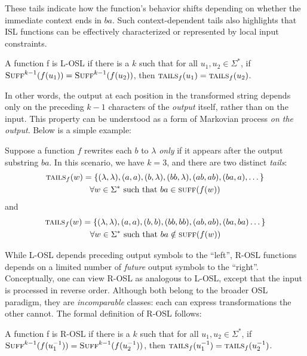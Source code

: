 These tails indicate how the function's behavior shifts depending on whether the immediate context ends in $ba$. Such context-dependent tails also highlights that ISL functions can be effectively characterized or represented by local input constraints.

\begin{definition}[L-OSL]
A function f is L-OSL if there is a $k$ such that for all $u_1, u_2\in\Sigma^*$, if $\textsc{Suff}^{k-1}(f(u_1)) = \textsc{Suff}^{k-1}(f(u_2))$, then $\textsc{tails}_f(u_1) = \textsc{tails}_f(u_2)$.
\end{definition}

In other words, the output at each position in the transformed string depends only on the preceding $k-1$ characters of the \emph{output} itself, rather than on the input. This property can be understood as a form of Markovian process \emph{on the output}. Below is a simple example:
\begin{exmp}
Suppose a function $f$ rewrites each $b$ to $\lambda$ \emph{only} if it appears after the output substring $ba$. In this scenario, we have $k=3$, and there are two distinct \emph{tails}:
\begin{multline*}
    \textsc{tails}_f(w) = \{(\lambda, \lambda), (a, a), (b, \lambda),
    (bb, \lambda), (ab, ab), (ba, a), \dots\} \\
    \forall w\in\Sigma^*\text{ such that } ba\in\textsc{suff}(f(w))
\end{multline*}
and
\begin{multline*}
    \textsc{tails}_f(w) = \{(\lambda, \lambda), (a, a), (b, b),
    (bb, bb), (ab, ab), (ba, ba) \dots\} \\
    \forall w\in\Sigma^*\text{ such that } ba\notin\textsc{suff}(f(w))
\end{multline*}
\end{exmp}

While L-OSL depends preceding output symbols to the ``left'', R-OSL functions depends on a limited number of \emph{future} output symbols to the ``right''. Conceptually, one can view R-OSL as analogous to L-OSL, except that the input is processed in reverse order. Although both belong to the broader OSL paradigm, they are \emph{incomparable} classes: each can express transformations the other cannot. The formal definition of R-OSL follows:

\begin{definition}[R-OSL]
A function f is R-OSL if there is a $k$ such that for all $u_1, u_2\in\Sigma^*$, if $\textsc{Suff}^{k-1}(f(u_1^{-1})) = \textsc{Suff}^{k-1}(f(u_2^{-1}))$, then $\textsc{tails}_f(u_1^{-1}) = \textsc{tails}_f(u_2^{-1})$.
\end{definition}

